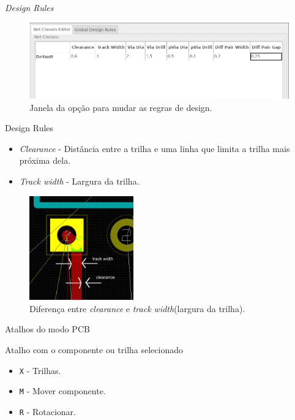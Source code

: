 \documentclass{beamer}
\begin{document}
\begin{frame}{\textit{Design Rules}}
	\begin{figure}
		\centering
		\includegraphics[width=1\textwidth]{Imagens/31_design_padrao.png}
		\caption{Janela da opção para mudar as regras de design.}
	\end{figure}
\end{frame}

\begin{frame}{Design Rules}
	\begin{itemize}
		\item \textit{Clearance} - Distância entre a trilha e uma linha que limita a trilha mais próxima dela.
		\item \textit{Track width} - Largura da trilha.
	\end{itemize}
	\begin{figure}
		\centering
		\includegraphics[width=0.4\textwidth]{Imagens/30_clearance.png}
		\caption{Diferença entre \textit{clearance} e \textit{track width}(largura da trilha).}
	\end{figure}
\end{frame} 

\begin{frame}{Atalhos do modo PCB}
	\begin{block}{Atalho com o componente ou trilha selecionado}
		\begin{itemize}
			\item \texttt{X} - Trilhas.
			\item \texttt{M} - Mover componente.
			\item \texttt{R} - Rotacionar.
		\end{itemize}
	\end{block}
\end{frame}
\end{document}
